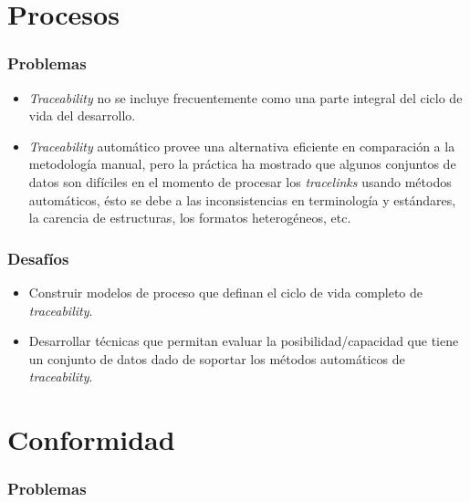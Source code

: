 \documentclass[a4paper,12pt,oneside,spanish]{book}
\begin{document}
\section{Procesos}

\subsubsection{Problemas}

\begin{itemize}[label={$\times$}]

\item \textit{Traceability} no se incluye frecuentemente como una parte integral del ciclo de vida del desarrollo.

\item \textit{Traceability} automático provee una alternativa eficiente en comparación a la metodología manual, pero la práctica ha mostrado que algunos conjuntos de datos son difíciles en el momento de procesar los \textit{tracelinks} usando métodos automáticos, ésto se debe a las inconsistencias en terminología y estándares, la carencia de estructuras, los formatos heterogéneos, etc.

\end{itemize}

\subsubsection{Desafíos}

\begin{itemize}[label={\checkmark}]

\item Construir modelos de proceso que definan el ciclo de vida completo de \textit{traceability}.

\item Desarrollar técnicas que permitan evaluar la posibilidad/capacidad que tiene un conjunto de datos dado de soportar los métodos automáticos de \textit{traceability}.
 
\end{itemize}

\section{Conformidad}

\subsubsection{Problemas}
\end{document}
